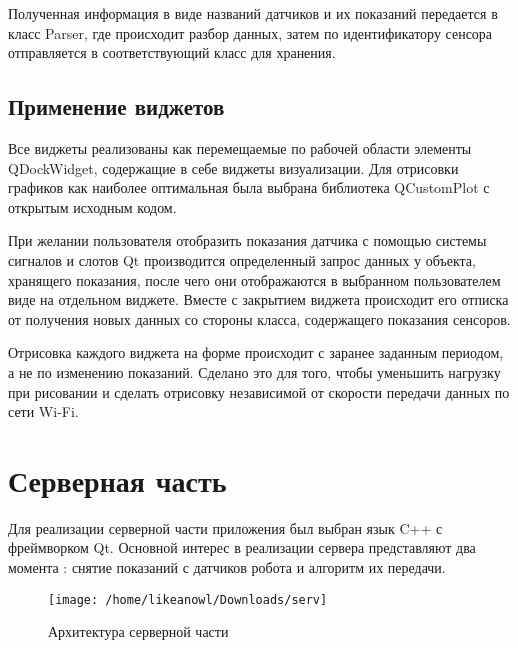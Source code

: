 \documentclass[conference]{IEEEtran}
\begin{document}
Полученная информация в виде названий датчиков и их показаний передается в класс Parser, где происходит разбор данных, затем по идентификатору сенсора отправляется в соответствующий класс для хранения. 
\subsection{Применение виджетов}
Все виджеты реализованы как перемещаемые по рабочей области элементы QDockWidget, содержащие в себе виджеты визуализации. Для отрисовки графиков как наиболее оптимальная была выбрана библиотека QCustomPlot \cite{qcustomplot} с открытым исходным кодом.


При желании пользователя отобразить показания датчика с помощью системы сигналов и слотов Qt производится определенный запрос данных у объекта, хранящего показания, после чего они отображаются в выбранном пользователем виде на отдельном виджете. Вместе с закрытием виджета происходит его отписка от получения новых данных со стороны класса, содержащего показания сенсоров.


Отрисовка каждого виджета на форме происходит с заранее заданным периодом, а не по изменению показаний. Сделано это для того, чтобы уменьшить нагрузку при рисовании и сделать отрисовку независимой от скорости передачи данных по сети Wi-Fi.

\section{Серверная часть}

Для реализации серверной части приложения был выбран язык C++ с фреймворком Qt. Основной интерес в реализации сервера представляют два момента : снятие показаний с датчиков робота и алгоритм их передачи.

\begin{figure*}
\centering
\texttt{[image: /home/likeanowl/Downloads/serv]}
\caption{Архитектура серверной части \label{overflow2}}
\end{figure*}
\end{document}
